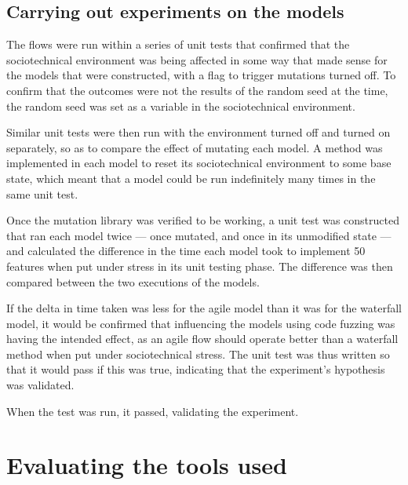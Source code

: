 \subsection{Carrying out experiments on the models}
The flows were run within a series of unit tests that confirmed that the sociotechnical environment was being affected in some way that made sense for the models that were constructed, with a flag to trigger mutations turned off. To confirm that the outcomes were not the results of the random seed at the time, the random seed was set as a variable in the sociotechnical environment.\par
Similar unit tests were then run with the environment turned off and turned on separately, so as to compare the effect of mutating each model. A method was implemented in each model to reset its sociotechnical environment to some base state, which meant that a model could be run indefinitely many times in the same unit test. \par
Once the mutation library was verified to be working, a unit test was constructed that ran each model twice --- once mutated, and once in its unmodified state --- and calculated the difference in the time each model took to implement 50 features when put under stress in its unit testing phase. The difference was then compared between the two executions of the models. \par
If the delta in time taken was less for the agile model than it was for the waterfall model, it would be confirmed that influencing the models using code fuzzing was having the intended effect, as an agile flow should operate better than a waterfall method when put under sociotechnical stress. The unit test was thus written so that it would pass if this was true, indicating that the experiment's hypothesis was validated. \par
When the test was run, it passed, validating the experiment. \par


\section{Evaluating the tools used}

